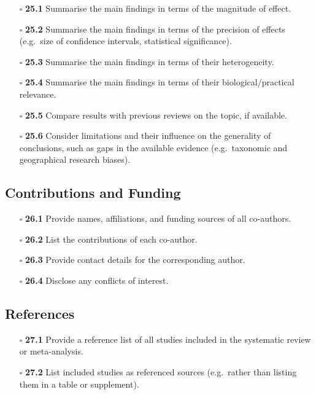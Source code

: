\documentclass[11pt]{article}
\def\tightlist{}
\begin{document}
\begin{Form}
\begin{itemize}
\tightlist
\item[$\square$]
  \textbf{25.1} Summarise the main findings in terms of the magnitude of
  effect.
\item[$\square$]
  \textbf{25.2} Summarise the main findings in terms of the precision of
  effects (e.g.~size of confidence intervals, statistical significance).
\item[$\square$]
  \textbf{25.3} Summarise the main findings in terms of their
  heterogeneity.
\item[$\square$]
  \textbf{25.4} Summarise the main findings in terms of their
  biological/practical relevance.
\item[$\square$]
  \textbf{25.5} Compare results with previous reviews on the topic, if
  available.
\item[$\square$]
  \textbf{25.6} Consider limitations and their influence on the
  generality of conclusions, such as gaps in the available evidence
  (e.g.~taxonomic and geographical research biases).
\end{itemize}

\subsection{Contributions and Funding}\label{contributions-and-funding}

\begin{itemize}
\tightlist
\item[$\square$]
  \textbf{26.1} Provide names, affiliations, and funding sources of all
  co-authors.
\item[$\square$]
  \textbf{26.2} List the contributions of each co-author.
\item[$\square$]
  \textbf{26.3} Provide contact details for the corresponding author.
\item[$\square$]
  \textbf{26.4} Disclose any conflicts of interest.
\end{itemize}

\subsection{References}\label{references}

\begin{itemize}
\tightlist
\item[$\square$]
  \textbf{27.1} Provide a reference list of all studies included in the
  systematic review or meta-analysis.
\item[$\square$]
  \textbf{27.2} List included studies as referenced sources (e.g.~rather
  than listing them in a table or supplement).
\end{itemize}

\end{Form}
\end{document}
